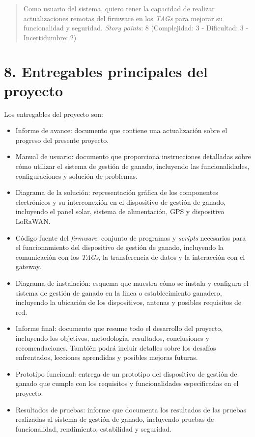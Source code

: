 \documentclass[
11pt, %
]{charter}
\begin{document}
\begin{quote}
Como usuario del sistema, quiero tener la capacidad de realizar actualizaciones remotas del firmware en los \emph{TAGs} para mejorar su funcionalidad y seguridad. \emph{Story points}: 8 (Complejidad: 3 - Dificultad: 3 - Incertidumbre: 2)
\end{quote} 


\section{8. Entregables principales del proyecto}
\label{sec:entregables}

Los entregables del proyecto son:

\begin{itemize}
	\item Informe de avance: documento que contiene una actualización sobre el progreso del presente proyecto.
	\item Manual de usuario: documento que proporciona instrucciones detalladas sobre cómo utilizar el sistema de gestión de ganado, incluyendo las funcionalidades, configuraciones y solución de problemas.
	\item Diagrama de la solución: representación gráfica de los componentes electrónicos y su interconexión en el dispositivo de gestión de ganado, incluyendo el panel solar, sistema de alimentación, GPS y dispositivo LoRaWAN.
	\item Código fuente del \emph{firmware}: conjunto de programas y \emph{scripts} necesarios para el funcionamiento del dispositivo de gestión de ganado, incluyendo la comunicación con los \emph{TAGs}, la transferencia de datos y la interacción con el gateway.
	\item Diagrama de instalación: esquema que muestra cómo se instala y configura el sistema de gestión de ganado en la finca o establecimiento ganadero, incluyendo la ubicación de los dispositivos, antenas y posibles requisitos de red.
	\item Informe final: documento que resume todo el desarrollo del proyecto, incluyendo los objetivos, metodología, resultados, conclusiones y recomendaciones. También podrá incluir detalles sobre los desafíos enfrentados, lecciones aprendidas y posibles mejoras futuras.
	\item Prototipo funcional: entrega de un prototipo del dispositivo de gestión de ganado que cumple con los requisitos y funcionalidades especificadas en el proyecto.
	\item Resultados de pruebas: informe que documenta los resultados de las pruebas realizadas al sistema de gestión de ganado, incluyendo pruebas de funcionalidad, rendimiento, estabilidad y seguridad.
\end{itemize}
\end{document}
